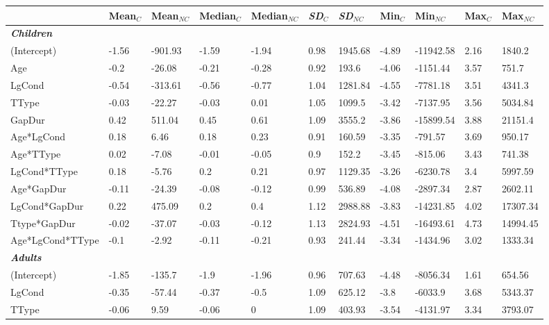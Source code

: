 \documentclass[authoryear, 12pt]{elsarticle}
\begin{document}
\linespread{1}
\begin{table}
  \begin{scriptsize}
\centering
  \begin{tabular}{lllllllllll}
    & Mean$_{C}$ & Mean$_{NC}$ & Median$_{C}$ & Median$_{NC}$ & \textit{SD}$_{C}$ & \textit{SD}$_{NC}$ & Min$_{C}$ & Min$_{NC}$ & Max$_{C}$ & Max$_{NC}$ \\
    \hline
	\textbf{\textit{Children}} &&&&& \\
    \hline
		(Intercept)			&	-1.56	&	-901.93	&	-1.59	&	-1.94	&	0.98	&	1945.68	&	-4.89	&	-11942.58	&	2.16	&	1840.2 \\
		Age					&	-0.2	&	-26.08	&	-0.21	&	-0.28	&	0.92	&	193.6	&	-4.06	&	-1151.44	&	3.57	&	751.7 \\
		LgCond				&	-0.54	&	-313.61	&	-0.56	&	-0.77	&	1.04	&	1281.84	&	-4.55	&	-7781.18	&	3.51	&	4341.3 \\
		TType				&	-0.03	&	-22.27	&	-0.03	&	0.01	&	1.05	&	1099.5	&	-3.42	&	-7137.95	&	3.56	&	5034.84 \\
		GapDur				&	0.42	&	511.04	&	0.45	&	0.61	&	1.09	&	3555.2	&	-3.86	&	-15899.54	&	3.88	&	21151.4 \\
		Age*LgCond			&	0.18	&	6.46	&	0.18	&	0.23	&	0.91	&	160.59	&	-3.35	&	-791.57		&	3.69	&	950.17 \\
		Age*TType			&	0.02	&	-7.08	&	-0.01	&	-0.05	&	0.9		&	152.2	&	-3.45	&	-815.06		&	3.43	&	741.38 \\
		LgCond*TType		&	0.18	&	-5.76	&	0.2		&	0.21	&	0.97	&	1129.35	&	-3.26	&	-6230.78	&	3.4		&	5997.59 \\
		Age*GapDur			&	-0.11	&	-24.39	&	-0.08	&	-0.12	&	0.99	&	536.89	&	-4.08	&	-2897.34	&	2.87	&	2602.11 \\
		LgCond*GapDur		&	0.22	&	475.09	&	0.2		&	0.4		&	1.12	&	2988.88	&	-3.83	&	-14231.85	&	4.02	&	17307.34 \\
		Ttype*GapDur		&	-0.02	&	-37.07	&	-0.03	&	-0.12	&	1.13	&	2824.93	&	-4.51	&	-16493.61	&	4.73	&	14994.45 \\
		Age*LgCond*TType	&	-0.1	&	-2.92	&	-0.11	&	-0.21	&	0.93	&	241.44	&	-3.34	&	-1434.96	&	3.02	&	1333.34 \\
    \hline
	\textbf{\textit{Adults}} &&&&& \\
    \hline
		(Intercept)		&	-1.85	&	-135.7	&	-1.9	&	-1.96	&	0.96	&	707.63	&	-4.48		&	-8056.34	&	1.61	&	654.56 \\
		LgCond			&	-0.35	&	-57.44	&	-0.37	&	-0.5	&	1.09	&	625.12	&	-3.8		&	-6033.9		&	3.68	&	5343.37 \\
		TType			&	-0.06	&	9.59	&	-0.06	&	0		&	1.09	&	403.93	&	-3.54		&	-4131.97	&	3.34	&	3793.07 \\

\end{tabular}
\end{scriptsize}
\end{table}
\end{document}
